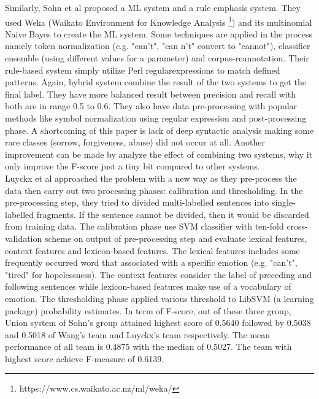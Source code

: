 Similarly, Sohn et al \cite{Sohn2012} proposed a ML system and a rule emphasis system. They used Weka (Waikato Environment for Knowledge Analysis \footnote{https://www.cs.waikato.ac.nz/ml/weka/}) and its multinomial Naive Bayes to create the ML system. Some techniques are applied in the process namely token normalization (e.g. "can’t", "can n’t" convert to "cannot"), classifier ensemble (using different values for a parameter) and corpus-reannotation. Their rule-based system simply utilize Perl regularexpressions to match defined patterns. Again, hybrid system combine the result of the two systems to get the final label. They have more balanced result between precision and recall with both are in range 0.5 to 0.6. They also have data pre-processing with popular methods like symbol normalization using regular expression and post-processing phase. A shortcoming of this paper is lack of deep syntactic analysis making some rare classes (sorrow, forgiveness, abuse) did not occur at all. Another improvement can be made by analyze the effect of combining two systems, why it only improve the F-score just a tiny bit compared to other systems.\\

Luyckx et al \cite{Luyckx2012} approached the problem with a new way as they pre-process the data then carry out two processing phases: calibration and thresholding. In the pre-processing step, they tried to divided multi-labelled sentences into single-labelled fragments. If the sentence cannot be divided, then it would be discarded from training data. The calibration phase use SVM classifier with ten-fold cross-validation scheme on output of pre-processing step and evaluate lexical features, context features and lexicon-based features. The lexical features includes some frequently occurred word that associated with a specific emotion (e.g. "can’t", "tired" for hopelessness). The context features consider the label of preceding and following sentences while lexicon-based features make use of a vocabulary of emotion. The thresholding phase applied various threshold to LibSVM (a learning package) probability estimates. In term of F-score, out of these three group, Union system of Sohn’s group attained highest score of 0.5640 followed by 0.5038 and 0.5018 of Wang’s team and Luyckx’s team respectively. The mean performance of all team is 0.4875 with the median of 0.5027. The team with highest score achieve F-measure of 0.6139.\\

